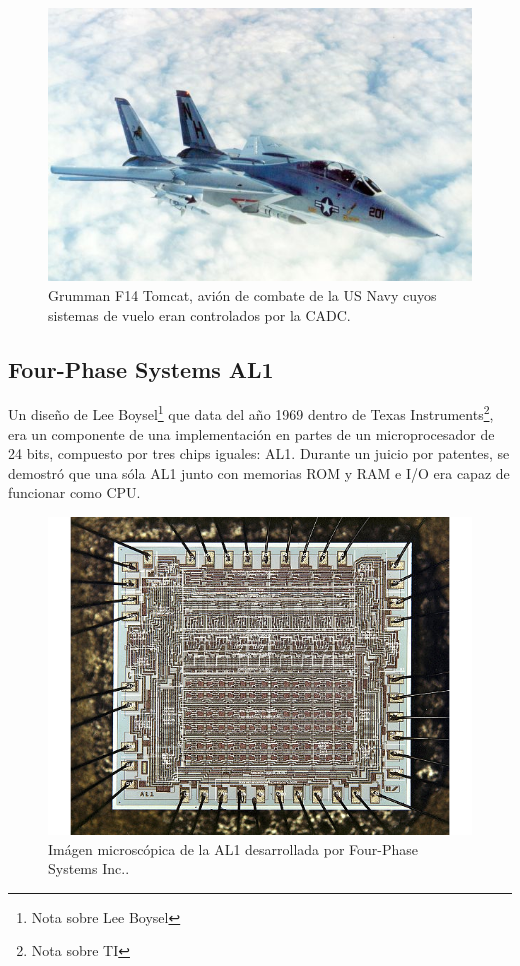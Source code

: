 \begin{figure}
  \centering
  \includegraphics[scale=0.5]{./figures/C02-f14_tomcat}
  \captionsetup{justification=centering}
  \caption{Grumman F14 Tomcat, avión de combate de la US Navy cuyos sistemas de vuelo eran controlados por la CADC.}
  \label{fig:C02-f14_tomcat}
\end{figure}


\subsection{Four-Phase Systems AL1}

Un diseño de Lee Boysel\footnote{Nota sobre Lee Boysel} que data del año 1969 dentro de Texas Instruments\footnote{Nota sobre TI}, era un componente de una implementación en partes de un microprocesador de 24 bits, compuesto por tres chips iguales: AL1. Durante un juicio por patentes, se demostró que una sóla AL1 junto con memorias ROM y RAM e I/O era capaz de funcionar como CPU.

\begin{figure}
  \centering
  \includegraphics[scale=0.5]{./figures/C02-al1}
  \captionsetup{justification=centering}
  \caption{Imágen microscópica de la AL1 desarrollada por Four-Phase Systems Inc..}
  \label{fig:C02-al1}
\end{figure}


